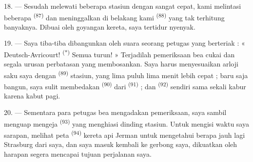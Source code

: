 18. --- Sesudah melewati beberapa stasiun dengan sangat cepat, kami
melintasi beberapa  \textsuperscript{(87)} dan
meninggalkan di belakang kami 
\textsuperscript{(88)}  yang tak terhitung
banyaknya. Dibuai oleh goyangan kereta, saya tertidur nyenyak.

\VUsaut{3.0mm}
\VUsaut{3.0mm}

19. --- Saya tiba-tiba dibangunkan oleh suara seorang petugas yang
berteriak : « Deutsch-Avricourt! \textsuperscript{(*)} Semua turun! »
Terjadilah pemeriksaan bea cukai dan segala urusan perbatasan yang
membosankan. Saya harus menyesuaikan arloji saku saya dengan
 \textsuperscript{(89)} stasiun, yang lima puluh lima
menit lebih cepat ; baru saja bangun, saya sulit membedakan
 \textsuperscript{(90)} dari 
\textsuperscript{(91)} ; dan 
\textsuperscript{(92)} sendiri sama sekali kabur karena kabut pagi.

20. --- Sementara para petugas bea mengadakan pemeriksaan, saya sambil
menguap mengeja  \textsuperscript{(93)} yang
menghiasi dinding stasiun. Untuk mengisi waktu saya sarapan, melihat
peta  \textsuperscript{(94)} kereta api Jerman untuk
mengetahui berapa jauh lagi Strasburg dari saya, dan saya masuk
kembali ke gerbong saya, dikuatkan oleh harapan segera mencapai tujuan
perjalanan saya.

\VUsaut{6.0mm}
\VUfilet{22mm}
